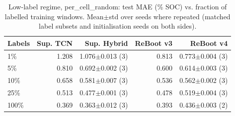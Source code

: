 \begin{table}[t]
\centering
\caption{Low-label regime, per\_cell\_random: test MAE (\% SOC) vs. fraction of labelled training windows. Mean$\pm$std over seeds where repeated (matched label subsets and initialisation seeds on both sides).}
\label{tab:lowlabel_per_cell_random}
\begin{tabular}{lrrrr}
\toprule
Labels & Sup. TCN & Sup. Hybrid & ReBoot v3 & ReBoot v4 \\
\midrule
1\% & 1.208 & 1.076$\pm$0.013 (3) & 0.813 & 0.773$\pm$0.004 (3) \\
5\% & 0.810 & 0.692$\pm$0.002 (3) & 0.600 & 0.614$\pm$0.003 (3) \\
10\% & 0.658 & 0.581$\pm$0.007 (3) & 0.536 & 0.562$\pm$0.002 (3) \\
25\% & 0.513 & 0.477$\pm$0.001 (3) & 0.478 & 0.519$\pm$0.004 (3) \\
100\% & 0.369 & 0.363$\pm$0.012 (3) & 0.393 & 0.436$\pm$0.003 (2) \\
\bottomrule
\end{tabular}
\end{table}